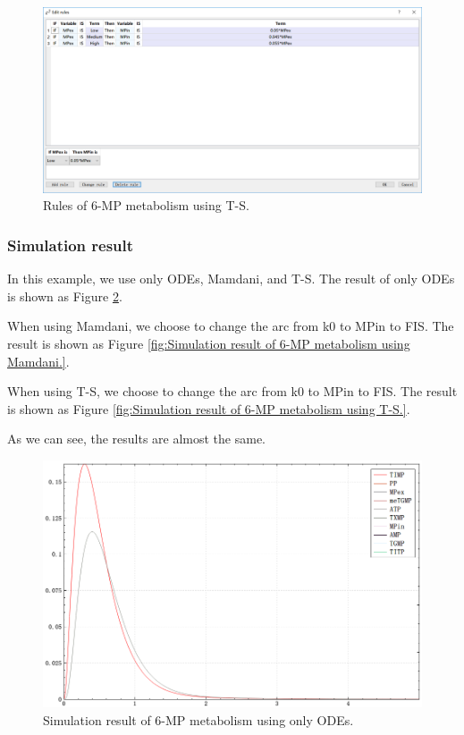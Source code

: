 \documentclass[journal,a4paper,onecolumn]{article}
\begin{document}
\begin{figure}[!hbt]
	\begin{center}
		\includegraphics[width=\columnwidth]{fig60}
		\caption{Rules of 6-MP metabolism using T-S.}
		\label{fig:Rules of 6-MP metabolism using T-S.}
	\end{center}
\end{figure}


\subsubsection{Simulation result}
In this example, we use only ODEs, Mamdani, and T-S. The result of only ODEs is shown as Figure \ref{fig:Simulation result of 6-MP metabolism using only ODEs.}.

When using Mamdani, we choose to change the arc from k0 to MPin to FIS. The result is shown as Figure \ref{fig:Simulation result of 6-MP metabolism using Mamdani.}.

When using T-S, we choose to change the arc from k0 to MPin to FIS. The result is shown as Figure \ref{fig:Simulation result of 6-MP metabolism using T-S.}.

As we can see, the results are almost the same.

\begin{figure}[!hbt]
	\begin{center}
		\includegraphics[width=\columnwidth]{fig54}
		\caption{Simulation result of 6-MP metabolism using only ODEs.}
		\label{fig:Simulation result of 6-MP metabolism using only ODEs.}
	\end{center}
\end{figure}
\end{document}
